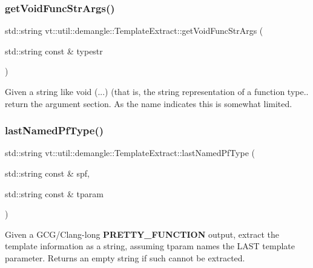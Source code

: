 \subsubsection{\texorpdfstring{get\+Void\+Func\+Str\+Args()}{getVoidFuncStrArgs()}}
{\footnotesize\ttfamily std\+::string vt\+::util\+::demangle\+::\+Template\+Extract\+::get\+Void\+Func\+Str\+Args (\begin{DoxyParamCaption}\item[{std\+::string const \&}]{typestr }\end{DoxyParamCaption})\hspace{0.3cm}{\ttfamily [static]}}

Given a string like \textquotesingle{}void (...)\textquotesingle{} (that is, the string representation of a function type.. return the argument section. As the name indicates this is somewhat limited. \mbox{\label{structvt_1_1util_1_1demangle_1_1_template_extract_a8fe842098a300f5b31f5ab1b0a76804b}} 
\subsubsection{\texorpdfstring{last\+Named\+Pf\+Type()}{lastNamedPfType()}}
{\footnotesize\ttfamily std\+::string vt\+::util\+::demangle\+::\+Template\+Extract\+::last\+Named\+Pf\+Type (\begin{DoxyParamCaption}\item[{std\+::string const \&}]{spf,  }\item[{std\+::string const \&}]{tparam }\end{DoxyParamCaption})\hspace{0.3cm}{\ttfamily [static]}}

Given a G\+C\+G/\+Clang-\/long {\bfseries P\+R\+E\+T\+T\+Y\+\_\+\+F\+U\+N\+C\+T\+I\+ON} output, extract the template information as a string, assuming tparam names the L\+A\+ST template parameter. Returns an empty string if such cannot be extracted. \mbox{\label{structvt_1_1util_1_1demangle_1_1_template_extract_a544c77a181038fc1de063fe3d3fc761d}} 
